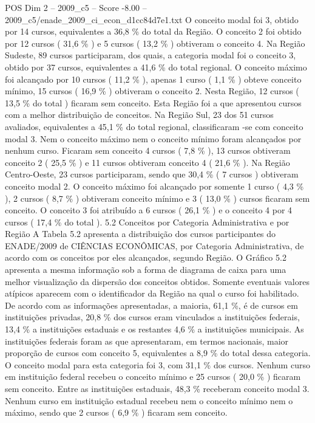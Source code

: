 \begin{textsample}{POS Dim 2 – 2009\_c5 – Score -8.00 – 2009\_c5/enade\_2009\_ci\_econ\_d1cc84d7e1.txt}
O conceito modal foi 3, obtido por 14 cursos, equivalentes a 36,8 \% do total da Região.
O conceito 2 foi obtido por 12 cursos ( 31,6 \% ) e 5 cursos ( 13,2 \% ) obtiveram o conceito 4.
Na Região Sudeste, 89 cursos participaram, dos quais, a categoria modal foi o conceito 3, obtido por 37 cursos, equivalentes a 41,6 \% do total regional.
O conceito máximo foi alcançado por 10 cursos ( 11,2 \% ), apenas 1 curso ( 1,1 \% ) obteve conceito mínimo, 15 cursos ( 16,9 \% ) obtiveram o conceito 2.
Nesta Região, 12 cursos ( 13,5 \% do total ) ficaram sem conceito.
Esta Região foi a que apresentou cursos com a melhor distribuição de conceitos.
Na Região Sul, 23 dos 51 cursos avaliados, equivalentes a 45,1 \% do total regional, classificaram -se com conceito modal 3.
Nem o conceito máximo nem o conceito mínimo foram alcançados por nenhum curso.
Ficaram sem conceito 4 cursos ( 7,8 \% ), 13 cursos obtiveram conceito 2 ( 25,5 \% ) e 11 cursos obtiveram conceito 4 ( 21,6 \% ).
Na Região Centro-Oeste, 23 cursos participaram, sendo que 30,4 \% ( 7 cursos ) obtiveram conceito modal 2.
O conceito máximo foi alcançado por somente 1 curso ( 4,3 \% ), 2 cursos ( 8,7 \% ) obtiveram conceito mínimo e 3 ( 13,0 \% ) cursos ficaram sem conceito.
O conceito 3 foi atribuído a 6 cursos ( 26,1 \% ) e o conceito 4 por 4 cursos ( 17,4 \% do total ). 5.2 Conceitos por Categoria Administrativa e por Região A Tabela 5.2 apresenta a distribuição dos cursos participantes do ENADE/2009 de CIÊNCIAS ECONÔMICAS, por Categoria Administrativa, de acordo com os conceitos por eles alcançados, segundo Região.
O Gráfico 5.2 apresenta a mesma informação sob a forma de diagrama de caixa para uma melhor visualização da dispersão dos conceitos obtidos.
Somente eventuais valores atípicos aparecem com o identificador da Região na qual o curso foi habilitado.
De acordo com as informações apresentadas, a maioria, 61,1 \%, é de cursos em instituições privadas, 20,8 \% dos cursos eram vinculados a instituições federais, 13,4 \% a instituições estaduais e os restantes 4,6 \% a instituições municipais.
As instituições federais foram as que apresentaram, em termos nacionais, maior proporção de cursos com conceito 5, equivalentes a 8,9 \% do total dessa categoria.
O conceito modal para esta categoria foi 3, com 31,1 \% dos cursos.
Nenhum curso em instituição federal recebeu o conceito mínimo e 25 cursos ( 20,0 \% ) ficaram sem conceito.
Entre as instituições estaduais, 48,3 \% receberam conceito modal 3.
Nenhum curso em instituição estadual recebeu nem o conceito mínimo nem o máximo, sendo que 2 cursos ( 6,9 \% ) ficaram sem conceito.

\end{textsample}
